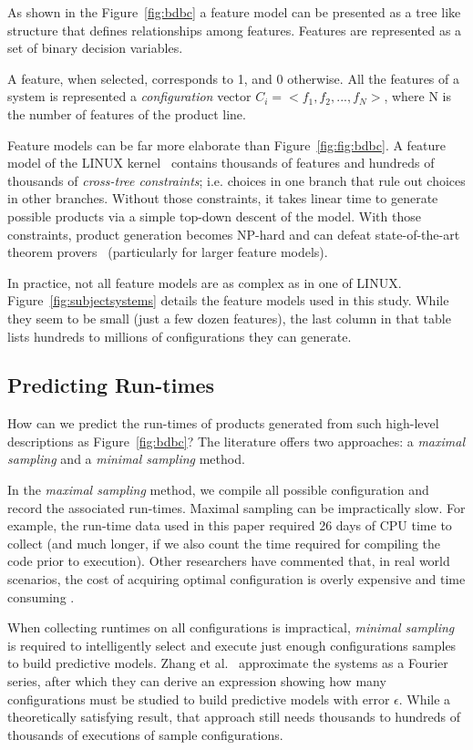 \documentclass{sig-alternative}
\newcommand{\fig}[1]{Figure~\ref{fig:#1}}
\begin{document}
As shown in the Figure~\ref{fig:bdbc} a feature model can be presented as a tree like structure that defines relationships among features.   Features are represented as a set of binary decision variables. 

A feature, when selected, corresponds to 1, and 0 otherwise. All the features of a system is represented a {\em configuration} vector  $C_i= <f_1, f_2, ...,f_N>$, 
where N is the number of features of the product line.  
    
Feature models can be far more elaborate than \fig{fig:bdbc}. 
A feature model of the LINUX kernel~\cite{sayyad13b} contains thousands of features and hundreds of thousands of  {\em cross-tree constraints}; i.e. choices in one branch that rule out choices in other branches. 
Without those constraints, it takes linear time to generate possible products via a simple
top-down descent of the model. With those constraints, product generation becomes NP-hard and can
 defeat state-of-the-art theorem provers~\cite{pohl11} (particularly for larger feature models).
 
 
 
In practice, not all feature models are as complex as in one of LINUX.
\fig{subjectsystems} details the feature models used in this study. While
they seem to be small (just a few dozen features), the last column in that table lists hundreds
to millions of configurations they can generate.


\subsection{Predicting Run-times}\label{sect:addit}
How can we predict the run-times of products generated from such high-level descriptions
as \fig{bdbc}? The literature offers two approaches: a {\em maximal sampling} and a {\em minimal sampling} method.

In the {\em maximal sampling} method, we compile all  possible configuration and record the associated run-times. Maximal sampling  can be impractically slow.
For example, the run-time data used in this paper required  26 days of CPU time to collect (and much longer, if we also count the time required
 for compiling the code prior to execution). 
 Other researchers have commented that,  in 
 real world scenarios, the cost of acquiring optimal configuration is overly expensive and time consuming \cite{weiss2008maximizing}.
 
 When collecting runtimes on all configurations is impractical,  {\em minimal sampling } 
 is required to intelligently select and execute   just enough configurations samples to build
 predictive models.
 Zhang et al.~\cite{zhang2015performance} approximate the
 systems as a Fourier series, after which they can derive an expression showing how many configurations must be studied
 to build predictive models with error $\epsilon$. While a theoretically satisfying result, that approach still needs thousands to hundreds of thousands of executions of sample
 configurations.  
\end{document}
